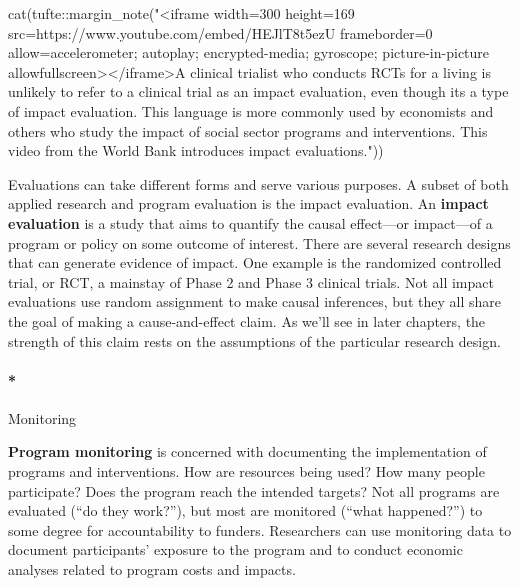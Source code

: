 \documentclass[
  letterpaper,
  DIV=11,
  numbers=noendperiod,
  oneside]{scrartcl}
\let\oldparagraph\paragraph
\renewcommand{\paragraph}[1]{\oldparagraph{#1}\mbox{}}
\newenvironment{Shaded}{\begin{snugshade}}{\end{snugshade}}
\newcommand{\FunctionTok}[1]{\textcolor[rgb]{0.28,0.35,0.67}{#1}}
\newcommand{\NormalTok}[1]{\textcolor[rgb]{0.00,0.23,0.31}{#1}}
\newcommand{\SpecialCharTok}[1]{\textcolor[rgb]{0.37,0.37,0.37}{#1}}
\newcommand{\StringTok}[1]{\textcolor[rgb]{0.13,0.47,0.30}{#1}}
\begin{document}
\begin{Shaded}
\begin{Highlighting}[]
\FunctionTok{cat}\NormalTok{(tufte}\SpecialCharTok{::}\FunctionTok{margin\_note}\NormalTok{(}\StringTok{"\textless{}iframe width=\textquotesingle{}300\textquotesingle{} height=\textquotesingle{}169\textquotesingle{} src=\textquotesingle{}https://www.youtube.com/embed/HEJlT8t5ezU\textquotesingle{} frameborder=\textquotesingle{}0\textquotesingle{} allow=\textquotesingle{}accelerometer; autoplay; encrypted{-}media; gyroscope; picture{-}in{-}picture\textquotesingle{} allowfullscreen\textgreater{}\textless{}/iframe\textgreater{}A clinical trialist who conducts RCTs for a living is unlikely to refer to a clinical trial as an \textquotesingle{}impact evaluation\textquotesingle{}, even though it\textquotesingle{}s a type of impact evaluation. This language is more commonly used by economists and others who study the impact of social sector programs and interventions. This video from the World Bank introduces impact evaluations."}\NormalTok{))}
\end{Highlighting}
\end{Shaded}

Evaluations can take different forms and serve various purposes. A
subset of both applied research and program evaluation is the impact
evaluation. An \textbf{impact evaluation} is a study that aims to
quantify the causal effect---or impact---of a program or policy on some
outcome of interest. There are several research designs that can
generate evidence of impact. One example is the randomized controlled
trial, or RCT, a mainstay of Phase 2 and Phase 3 clinical trials. Not
all impact evaluations use random assignment to make causal inferences,
but they all share the goal of making a cause-and-effect claim. As we'll
see in later chapters, the strength of this claim rests on the
assumptions of the particular research design.

\hypertarget{monitoring}{%
\paragraph*{Monitoring}\label{monitoring}}

\textbf{Program monitoring} is concerned with documenting the
implementation of programs and interventions. How are resources being
used? How many people participate? Does the program reach the intended
targets? Not all programs are evaluated (``do they work?''), but most
are monitored (``what happened?'') to some degree for accountability to
funders. Researchers can use monitoring data to document participants'
exposure to the program and to conduct economic analyses related to
program costs and impacts.
\end{document}
